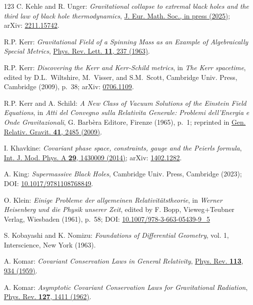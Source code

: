 \begin{thebibliography}{123}
C. Kehle and R. Unger:
{\em Gravitational collapse to extremal black holes and the third law of black hole thermodynamics},
\href{https://doi.org/10.4171/jems/1591}{J. Eur. Math. Soc., in press (2025)};
arXiv: \href{https://arxiv.org/abs/2211.15742}{2211.15742}.

R.P. Kerr:
{\em Gravitational Field of a Spinning Mass as an Example of Algebraically Special Metrics},
\href{https://doi.org/10.1103/PhysRevLett.11.237}{Phys. Rev. Lett. {\bf 11}, 237 (1963)}.

R.P. Kerr: {\em Discovering the Kerr and Kerr-Schild metrics},
in {\em The Kerr spacetime}, edited by D.L.~Wiltshire, M.~Visser, and S.M.~Scott,
Cambridge Univ. Press, Cambridge (2009), p.~38;
arXiv: \href{https://arxiv.org/abs/0706.1109}{0706.1109}.

R.P. Kerr and A. Schild:
{\em A New Class of Vacuum Solutions of the Einstein Field Equations},
in {\em Atti del Convegno sulla Relativita Generale: Problemi
dell’Energia e Onde Gravitazionali}, G. Barbèra Editore,
Firenze (1965), p.~1; reprinted in
\href{https://doi.org/10.1007/s10714-009-0857-z}{Gen. Relativ. Gravit. {\bf 41}, 2485 (2009)}.

I. Khavkine:
{\em Covariant phase space, constraints, gauge and the Peierls formula},
\href{https://doi.org/10.1142/S0217751X14300099}{Int. J. Mod. Phys. A  {\bf 29}, 1430009 (2014)};
arXiv: \href{https://arxiv.org/abs/1402.1282}{1402.1282}.

A. King:
{\em Supermassive Black Holes},
Cambridge Univ. Press, Cambridge (2023);
DOI: \href{https://doi.org/10.1017/9781108768849}{10.1017/9781108768849}.

O. Klein:
{\em Einige Probleme der allgemeinen Relativitätstheorie},
in {\em Werner Heisenberg und die Physik unserer Zeit},
edited by F. Bopp, Vieweg+Teubner Verlag, Wiesbaden (1961), p.~58;
DOI: \href{https://doi.org/10.1007/978-3-663-05439-9_5}{10.1007/978-3-663-05439-9\_5}

S. Kobayashi and K. Nomizu:
{\em Foundations of Differential Geometry}, vol. 1,
Interscience, New York (1963).

A. Komar:
{\em Covariant Conservation Laws in General Relativity},
\href{https://doi.org/10.1103/PhysRev.113.934}{Phys. Rev. {\bf 113}, 934 (1959)}.

A. Komar:
{\em Asymptotic Covariant Conservation Laws for Gravitational Radiation},
\href{https://doi.org/10.1103/PhysRev.127.1411}{Phys. Rev. {\bf 127}, 1411 (1962)}.


\end{thebibliography}

